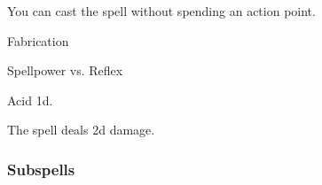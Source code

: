 You can cast the spell without spending an action point.




\newpage
\begin{spellsection}{Fabrication}

\begin{spellheader}
\end{spellheader}

\begin{spellcontent}

\begin{spelltargetinginfo}




\end{spelltargetinginfo}


\begin{spelleffects}




\begin{spellattack}{Spellpower vs. Reflex}


\hit
Acid  \plus1d.



\end{spellattack}





\end{spelleffects}

\end{spellcontent}
\begin{spellfooter}


\end{spellfooter}
\begin{spellsubcontent}


\begin{spellcantrip}
The spell deals \minus2d damage.
\end{spellcantrip}


\end{spellsubcontent}
\end{spellsection}


\subsubsection{Subspells}


